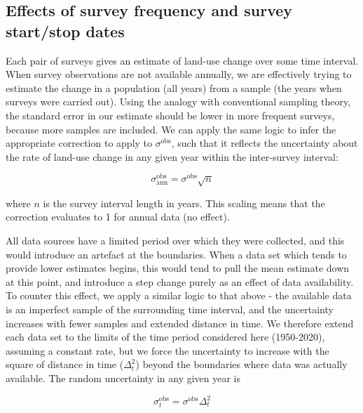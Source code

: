 \documentclass[
]{book}
\begin{document}
\hypertarget{effects-of-survey-frequency-and-survey-startstop-dates}{%
\subsection{Effects of survey frequency and survey start/stop dates}\label{effects-of-survey-frequency-and-survey-startstop-dates}}

Each pair of surveys gives an estimate of land-use change over some time interval.
When survey observations are not available annually, we are effectively trying to estimate the change in a population (all years) from a sample (the years when surveys were carried out).
Using the analogy with conventional sampling theory, the standard error in our estimate should be lower in more frequent surveys, because more samples are included.
We can apply the same logic to infer the appropriate correction to apply to \(\sigma^\mathrm{obs}\), such that it reflects the uncertainty about the rate of land-use change in any given year within the inter-survey interval:

\begin{equation} \label{eq:sigma_ann}
  \sigma_\mathrm{ann}^\mathrm{obs} = \sigma^\mathrm{obs} \sqrt{n}
\end{equation}

where \(n\) is the survey interval length in years. This scaling means that the correction evaluates to 1 for annual data (no effect).

All data sources have a limited period over which they were collected, and this would introduce an artefact at the boundaries.
When a data set which tends to provide lower estimates begins, this would tend to pull the mean estimate down at this point, and introduce a step change purely as an effect of data availability.
To counter this effect, we apply a similar logic to that above - the available data is an imperfect sample of the surrounding time interval, and the uncertainty increases with fewer samples and extended distance in time.
We therefore extend each data set to the limits of the time period considered here (1950-2020), assuming a constant rate, but we force the uncertainty to increase with the square of distance in time (\(\Delta_t^2\)) beyond the boundaries where data was actually available. The random uncertainty in any given year is

\begin{equation} \label{eq:sigma_t}
  \sigma_{t}^\mathrm{obs} = \sigma^\mathrm{obs} \Delta_t^2
\end{equation}
\end{document}
